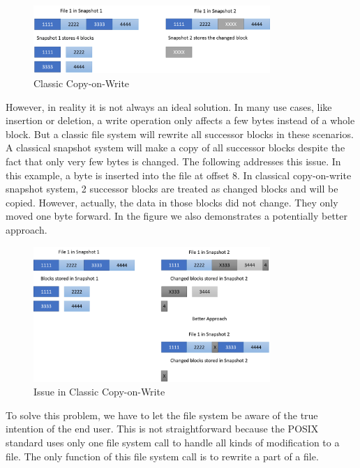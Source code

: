 \begin{figure}[t]
\centering
\includegraphics[width=0.8\textwidth]{Chapter-4/figs/fig4.png}
\caption{Classic Copy-on-Write}
\label{fig:classic_cow}
\end{figure}

    However, in reality it is not always an ideal solution. In many use cases, like insertion or deletion, a write operation only affects a few bytes instead of a whole block. But a classic file system will rewrite all successor blocks in these scenarios. A classical snapshot system will make a copy of all successor blocks despite the fact that only very few bytes is changed. The following  addresses this issue. In this example, a byte is inserted into the file at offset 8. In classical copy-on-write snapshot system, 2 successor blocks are treated as changed blocks and will be copied. However, actually, the data in those blocks did not change. They only moved one byte forward. In the figure we also demonstrates a potentially better approach.

\begin{figure}[t]
\centering
\includegraphics[width=0.8\textwidth]{Chapter-4/figs/fig5.png}
\caption{Issue in Classic Copy-on-Write}
\label{fig:issue_classic_cow}
\end{figure}
 
    To solve this problem, we have to let the file system be aware of the true intention of the end user. This is not straightforward because the POSIX standard uses only one file system call to handle all kinds of modification to a file. The only function of this file system call is to rewrite a part of a file.
    
